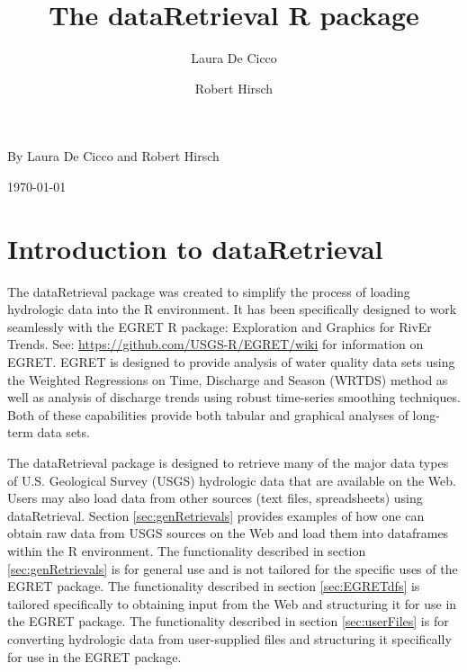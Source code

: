 \documentclass[a4paper,11pt]{article}\usepackage[]{graphicx}\usepackage[]{color}
\begin{document}
\renewenvironment{knitrout}{\begin{singlespace}}{\end{singlespace}}
\renewcommand*\listfigurename{Figures}

\renewcommand*\listtablename{Tables}


\title{The dataRetrieval R package}
\author[1]{Laura De Cicco}
\author[1]{Robert Hirsch}





\noindent\textsf{By Laura De Cicco and Robert Hirsch}

\noindent\textsf{\today}

% 

\tableofcontents
\listoffigures
\listoftables

\newpage

\section{Introduction to dataRetrieval}
The dataRetrieval package was created to simplify the process of loading hydrologic data into the R environment. It has been specifically designed to work seamlessly with the EGRET R package: Exploration and Graphics for RivEr Trends. See: \url{https://github.com/USGS-R/EGRET/wiki} for information on EGRET. EGRET is designed to provide analysis of water quality data sets using the Weighted Regressions on Time, Discharge and Season (WRTDS) method as well as analysis of discharge trends using robust time-series smoothing techniques.  Both of these capabilities provide both tabular and graphical analyses of long-term data sets.


The dataRetrieval package is designed to retrieve many of the major data types of U.S. Geological Survey (USGS) hydrologic data that are available on the Web. Users may also load data from other sources (text files, spreadsheets) using dataRetrieval.  Section \ref{sec:genRetrievals} provides examples of how one can obtain raw data from USGS sources on the Web and load them into dataframes within the R environment.  The functionality described in section \ref{sec:genRetrievals} is for general use and is not tailored for the specific uses of the EGRET package.  The functionality described in section \ref{sec:EGRETdfs} is tailored specifically to obtaining input from the Web and structuring it for use in the EGRET package.  The functionality described in section \ref{sec:userFiles} is for converting hydrologic data from user-supplied files and structuring it specifically for use in the EGRET package.
\end{document}
